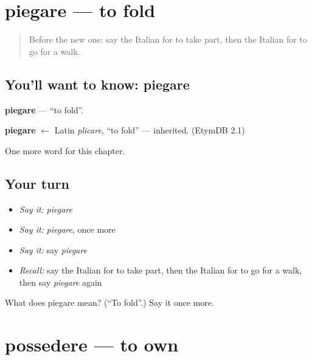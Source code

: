 \section[piegare]{piegare — to fold}

\label{lesson:IT-C180-piegare}



\begin{quote}
Before the new one: say the Italian for to take part, then the Italian for to go for a walk.
\end{quote}

\subsection*{You'll want to know: piegare}
\textbf{piegare} — \textquotedblleft{}to fold\textquotedblright{}.

\begin{cousinweb}
\textbf{piegare} $\leftarrow$ Latin \emph{plicare}, \textquotedblleft{}to fold\textquotedblright{} — inherited. (EtymDB 2.1)
\end{cousinweb}

\begin{grammarlens}[title={What you've built}]
One more word for this chapter.
\end{grammarlens}

\subsection*{Your turn}
\begin{itemize}
\raggedright
  \item \emph{Say it:} \emph{piegare}
  \item \emph{Say it:} \emph{piegare}, once more
  \item \emph{Say it:} say \emph{piegare}
  \item \emph{Recall:} say the Italian for to take part, then the Italian for to go for a walk, then say \emph{piegare} again
\end{itemize}

\begin{tcolorbox}[breakable,colback=teal!4,colframe=teal!35!black,title={Before you move on}]
What does piegare mean? (\textquotedblleft{}To fold\textquotedblright{}.) Say it once more.
\end{tcolorbox}
\section[possedere]{possedere — to own}

